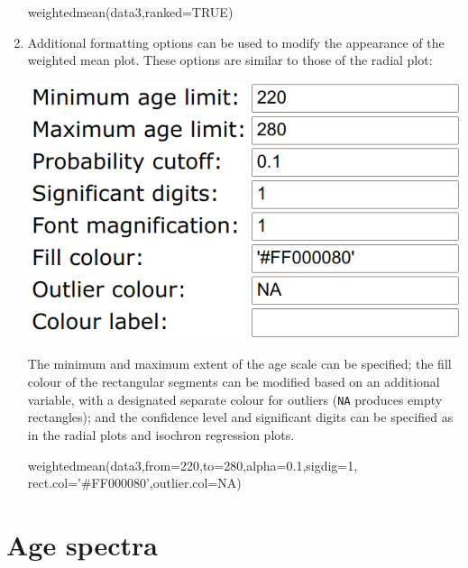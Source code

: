 \begin{refsection}
\begin{enumerate}
\begin{console}
weightedmean(data3,ranked=TRUE)
\end{console}

\item Additional formatting options can be used to modify the
  appearance of the weighted mean plot. These options are similar to
  those of the radial plot:

\noindent\begin{minipage}[t]{.42\linewidth}
\strut\vspace*{-\baselineskip}\newline
  \includegraphics[width=\linewidth]{../figures/OtherWtdMeanRemainingOptions.png}
\end{minipage}
\begin{minipage}[t]{.58\linewidth}
  The minimum and maximum extent of the age scale can be specified;
  the fill colour of the rectangular segments can be modified based on
  an additional variable, with a designated separate colour for
  outliers (\texttt{NA} produces empty rectangles); and the confidence
  level and significant digits can be specified as in the radial plots
  and isochron regression plots.
\end{minipage}

\begin{script}
weightedmean(data3,from=220,to=280,alpha=0.1,sigdig=1,
             rect.col='#FF000080',outlier.col=NA)
\end{script}

\end{enumerate}
 
\section{Age spectra}\label{sec:OtherAgeSpectra}


\end{refsection}
